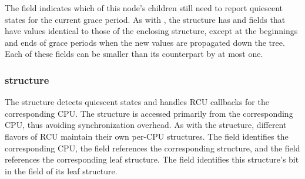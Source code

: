 The  field indicates which of this node's children
still need to report quiescent states for the current grace period.
%
As with , the  structure has  
and  fields that have values identical to those of the
enclosing  structure, except at the beginnings and ends
of grace periods when the new values are propagated down the tree.
Each of these fields can be smaller than 
its  counterpart by at most one.


\subsubsection{ structure} \label{sec:rcu_data}
The  structure detects quiescent states and handles RCU
callbacks for the corresponding CPU.
The structure is accessed primarily from the corresponding CPU,
thus avoiding synchronization overhead.
As with the  structure, different flavors of RCU maintain 
their own per-CPU  structures. %
%
The  field identifies the corresponding CPU, the 
field references the corresponding  structure, and the
 field references the corresponding leaf 
structure.
The  field identifies this  structure's bit
in the  field of its leaf  structure.

